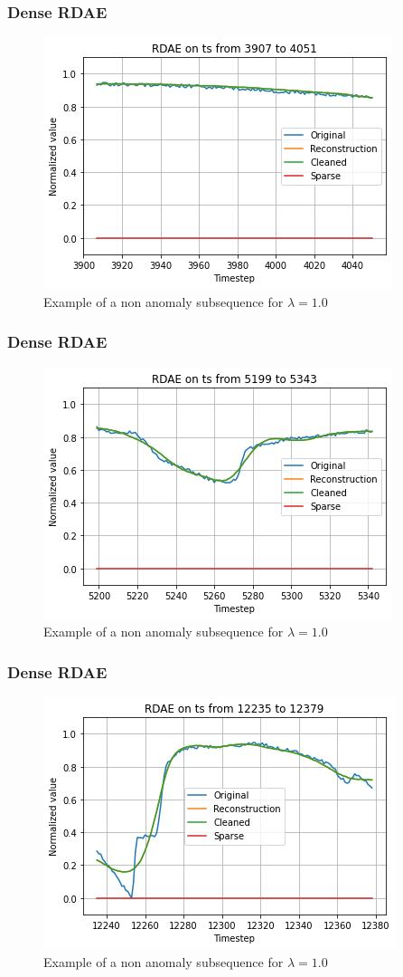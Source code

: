 \documentclass{beamer}
\theoremstyle{plain}
\theoremstyle{definition}
\theoremstyle{remark}
\begin{document}
\begin{frame}
	\frametitle{Dense RDAE}
	\begin{figure}
		\centering
		\includegraphics[width=0.7\linewidth]{Images/lam1.0ts_non_anomaly3907.jpg}
		\caption[]{Example of a non anomaly subsequence for $\lambda=1.0$}
	\end{figure}
\end{frame}

\begin{frame}
	\frametitle{Dense RDAE}
	\begin{figure}
		\centering
		\includegraphics[width=0.7\linewidth]{Images/lam1.0ts_non_anomaly5199.jpg}
		\caption[]{Example of a non anomaly subsequence for $\lambda=1.0$}
	\end{figure}
\end{frame}

\begin{frame}
	\frametitle{Dense RDAE}
	\begin{figure}
		\centering
		\includegraphics[width=0.7\linewidth]{Images/lam1.0ts_non_anomaly12235.jpg}
		\caption[]{Example of a non anomaly subsequence for $\lambda=1.0$}
	\end{figure}
\end{frame}
\end{document}
